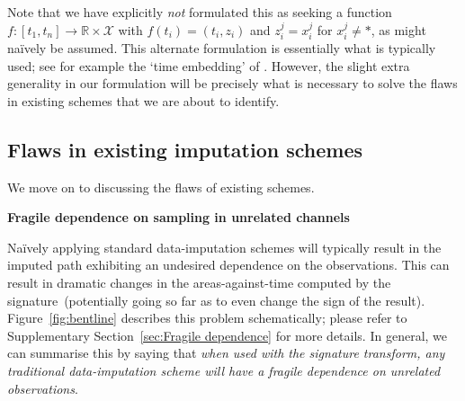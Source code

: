 \documentclass{article}
\renewcommand{\subsubsection}[1]{\textbf{#1}

} %
\newcommand{\reals}{\mathbb{R}}
\newcommand{\dataspace}{\mathcal{X}}
\begin{document}


Note that we have explicitly \emph{not} formulated this as seeking
a function $f \colon [t_1, t_n] \to \reals \times \dataspace$ with
$f(t_i) = (t_i, z_i)$ and $z_i^j = x_i^j$ for $x_i^j \neq *$, as might
na{\"i}vely be assumed. This alternate formulation is essentially what
is typically used; see for example the `time embedding' of
\citet{fermanian2019embedding}. However, the slight extra generality in
our formulation will be precisely what is necessary to solve the flaws
in existing schemes that we are about to identify.

\subsection{Flaws in existing imputation schemes}\label{section:flaws}

We move on to discussing the flaws of existing schemes.

\subsubsection{Fragile dependence on sampling in unrelated channels}

Na{\"i}vely applying standard data-imputation schemes will typically
result in the imputed path exhibiting an undesired dependence on the
observations. This can result in dramatic changes in the
areas-against-time computed by the signature~(potentially going so far
as to even change the sign of the result).
%
Figure~\ref{fig:bentline} describes this problem schematically; please
refer to Supplementary Section~\ref{sec:Fragile dependence} for more
details.
%
In general, we can summarise this by saying that \emph{when used with the signature transform, any traditional data-imputation scheme will have a fragile dependence on unrelated observations}.
\end{document}
